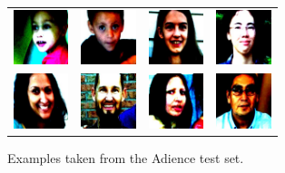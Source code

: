 \documentclass[journal]{IEEEtran}
\begin{document}
		\begin{figure}[!t]
			\centering
			\begin{tabular}{cccc}
				\includegraphics[width=1.6cm]{img/adience/1.jpg} & \includegraphics[width=1.6cm]{img/adience/2.jpg} & \includegraphics[width=1.6cm]{img/adience/3.jpg} & \includegraphics[width=1.6cm]{img/adience/4.jpg}\\
				\includegraphics[width=1.6cm]{img/adience/5.jpg} & \includegraphics[width=1.6cm]{img/adience/6.jpg} & \includegraphics[width=1.6cm]{img/adience/7.jpg} & \includegraphics[width=1.6cm]{img/adience/8.jpg}
			\end{tabular}						
			\caption{Examples taken from the Adience test set.}
			\label{fig:AdienceExamples}
		\end{figure}

	
\end{document}
